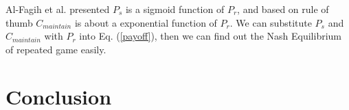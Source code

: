 \documentclass[journal,10pt,a4paper]{IEEEtran}
\begin{document}
Al-Fagih et al. presented\cite{DataPrice} $P_s$ is a sigmoid function of $P_r$, and based on rule of thumb $C_{maintain}$ is about a exponential function of $P_r$. We can substitute $P_s$ and $C_{maintain}$ with $P_r$ into Eq. (\ref{payoff}), then we can find out the Nash Equilibrium of repeated game easily.

\section{\normalsize\textbf{Conclusion}}



\end{document}
